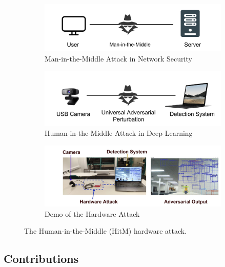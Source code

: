\begin{figure}[tpb]
    \centering
    \begin{subfigure}[b]{\linewidth}
        \includegraphics[width=\linewidth]{figures/chapter_detection/hardware/mitm.png}
        \caption{Man-in-the-Middle Attack in Network Security}
        \label{fig:mitm} 
    \end{subfigure}

    \begin{subfigure}[b]{\linewidth}
        \includegraphics[width=\linewidth]{figures/chapter_detection/hardware/overview.png}
        \caption{Human-in-the-Middle Attack in Deep Learning}
        \label{fig:minm}
    \end{subfigure}

    \begin{subfigure}[b]{\linewidth}
        \includegraphics[width=\linewidth]{figures/chapter_detection/hardware/demo.jpg}
        \caption{Demo of the Hardware Attack}
        \label{fig:demo}
    \end{subfigure}

  \caption{The Human-in-the-Middle (HitM)  hardware attack.}
  \label{fig:overview}
\end{figure}

\subsection{Contributions}

